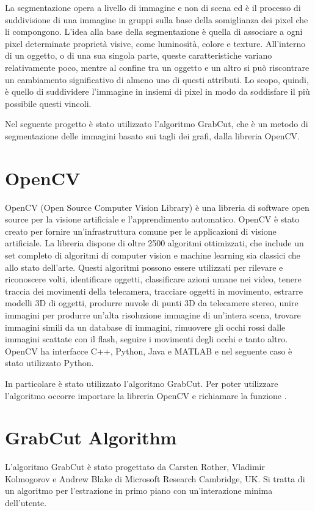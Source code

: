 \documentclass{article}
\newcommand{\code}[1]{\texttt{\detokenize{#1}}}
\begin{document}
La segmentazione opera a livello di immagine e non di scena ed è il processo di suddivisione di una immagine in gruppi sulla base della somiglianza dei pixel che li compongono.
L'idea alla base della segmentazione è quella di associare a ogni pixel determinate proprietà visive, come luminosità, colore e texture. All’interno di un oggetto, o di una sua singola parte, queste caratteristiche variano relativamente poco, mentre al confine tra un oggetto e un altro si può riscontrare un cambiamento significativo di almeno uno di questi attributi.
Lo scopo, quindi, è quello di suddividere l’immagine in insiemi di pixel in modo da soddisfare il più possibile questi vincoli.


Nel seguente progetto è stato utilizzato l'algoritmo GrabCut, che è un metodo di segmentazione delle immagini basato sui tagli dei grafi, dalla libreria OpenCV.

\section{OpenCV}
OpenCV (Open Source Computer Vision Library) è una libreria di software open source per la visione artificiale e l'apprendimento automatico. OpenCV è stato creato per fornire un'infrastruttura comune per le applicazioni di visione artificiale.
La libreria dispone di oltre 2500 algoritmi ottimizzati, che include un set completo di algoritmi di computer vision e machine learning sia classici che allo stato dell'arte. Questi algoritmi possono essere utilizzati per rilevare e riconoscere volti, identificare oggetti, classificare azioni umane nei video, tenere traccia dei movimenti della telecamera, tracciare oggetti in movimento, estrarre modelli 3D di oggetti, produrre nuvole di punti 3D da telecamere stereo, unire immagini per produrre un'alta risoluzione immagine di un'intera scena, trovare immagini simili da un database di immagini, rimuovere gli occhi rossi dalle immagini scattate con il flash, seguire i movimenti degli occhi e tanto altro.
OpenCV ha interfacce C++, Python, Java e MATLAB e nel seguente caso è stato utilizzato Python.


In particolare è stato utilizzato l'algoritmo GrabCut. Per poter utilizzare l'algoritmo occorre importare la libreria OpenCV e richiamare la funzione \code{grabCut()}.


\section{GrabCut Algorithm}
L'algoritmo GrabCut è stato progettato da Carsten Rother, Vladimir Kolmogorov e Andrew Blake di Microsoft Research Cambridge, UK. Si tratta di un algoritmo per l'estrazione in primo piano con un'interazione minima dell'utente.
\end{document}
